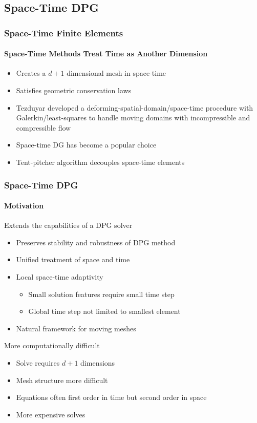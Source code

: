 \documentclass[18pt,xcolor=table]{beamer}
\begin{document}
\subsection{Space-Time DPG}
\setcounter{footnote}{0}

\begin{frame}[t]
\frametitle{Space-Time Finite Elements}
\framesubtitle{Space-Time Methods Treat Time as Another Dimension}
\begin{itemize}
  \item Creates a $d+1$ dimensional mesh in space-time
  \item Satisfies geometric conservation laws
  \item Tezduyar \etal{} developed a deforming-spatial-domain/space-time procedure 
  with Galerkin/least-squares to handle moving domains with incompressible and compressible flow
  \item Space-time DG has become a popular choice
  \item Tent-pitcher algorithm decouples space-time elements
\end{itemize}
\end{frame}


\begin{frame}[t]
\frametitle{Space-Time DPG}
\framesubtitle{Motivation}
Extends the capabilities of a DPG solver
\begin{itemize}
  \item Preserves stability and robustness of DPG method
  \item Unified treatment of space and time
  \item Local space-time adaptivity
  \begin{itemize}
    \item Small solution features require small time step
    \item Global time step not limited to smallest element
  \end{itemize}
  \item Natural framework for moving meshes
\end{itemize}
\bigskip

More computationally difficult
\begin{itemize}
  \item Solve requires $d+1$ dimensions
  \item Mesh structure more difficult
  \item Equations often first order in time but second order in space
  \item More expensive solves
\end{itemize}
\end{frame}
\end{document}

